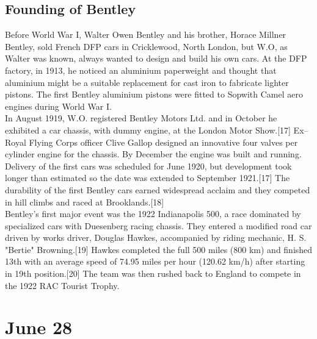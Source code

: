 \documentclass[11pt]{report}
\begin{document}
\subsection{Founding of Bentley}
Before World War I, Walter Owen Bentley and his brother, Horace Millner Bentley, sold French DFP cars in Cricklewood, North London, but W.O, as Walter was known, always wanted to design and build his own cars. At the DFP factory, in 1913, he noticed an aluminium paperweight and thought that aluminium might be a suitable replacement for cast iron to fabricate lighter pistons. The first Bentley aluminium pistons were fitted to Sopwith Camel aero engines during World War I.\\
In August 1919, W.O. registered Bentley Motors Ltd. and in October he exhibited a car chassis, with dummy engine, at the London Motor Show.[17] Ex–Royal Flying Corps officer Clive Gallop designed an innovative four valves per cylinder engine for the chassis. By December the engine was built and running. Delivery of the first cars was scheduled for June 1920, but development took longer than estimated so the date was extended to September 1921.[17] The durability of the first Bentley cars earned widespread acclaim and they competed in hill climbs and raced at Brooklands.[18]\\
Bentley's first major event was the 1922 Indianapolis 500, a race dominated by specialized cars with Duesenberg racing chassis. They entered a modified road car driven by works driver, Douglas Hawkes, accompanied by riding mechanic, H. S. "Bertie" Browning.[19] Hawkes completed the full 500 miles (800 km) and finished 13th with an average speed of 74.95 miles per hour (120.62 km/h) after starting in 19th position.[20] The team was then rushed back to England to compete in the 1922 RAC Tourist Trophy.
\section{June 28}
\end{document}

